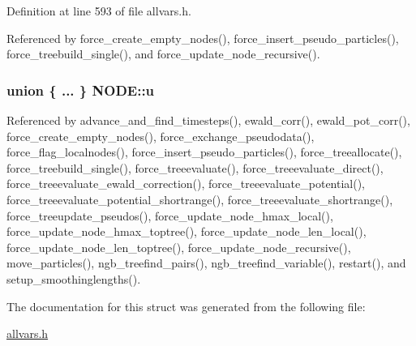 Definition at line 593 of file allvars.h.



Referenced by force\_\-create\_\-empty\_\-nodes(), force\_\-insert\_\-pseudo\_\-particles(), force\_\-treebuild\_\-single(), and force\_\-update\_\-node\_\-recursive().

\hypertarget{structNODE_acd7e6747d70c2205a6fb3d44b6465dd4}{
\subsubsection[{u}]{\setlength{\rightskip}{0pt plus 5cm}union \{ ... \} 
   {\bf NODE::u}}}
\label{structNODE_acd7e6747d70c2205a6fb3d44b6465dd4}


Referenced by advance\_\-and\_\-find\_\-timesteps(), ewald\_\-corr(), ewald\_\-pot\_\-corr(), force\_\-create\_\-empty\_\-nodes(), force\_\-exchange\_\-pseudodata(), force\_\-flag\_\-localnodes(), force\_\-insert\_\-pseudo\_\-particles(), force\_\-treeallocate(), force\_\-treebuild\_\-single(), force\_\-treeevaluate(), force\_\-treeevaluate\_\-direct(), force\_\-treeevaluate\_\-ewald\_\-correction(), force\_\-treeevaluate\_\-potential(), force\_\-treeevaluate\_\-potential\_\-shortrange(), force\_\-treeevaluate\_\-shortrange(), force\_\-treeupdate\_\-pseudos(), force\_\-update\_\-node\_\-hmax\_\-local(), force\_\-update\_\-node\_\-hmax\_\-toptree(), force\_\-update\_\-node\_\-len\_\-local(), force\_\-update\_\-node\_\-len\_\-toptree(), force\_\-update\_\-node\_\-recursive(), move\_\-particles(), ngb\_\-treefind\_\-pairs(), ngb\_\-treefind\_\-variable(), restart(), and setup\_\-smoothinglengths().



The documentation for this struct was generated from the following file:\begin{DoxyCompactItemize}
\item 
\hyperlink{allvars_8h}{allvars.h}\end{DoxyCompactItemize}
